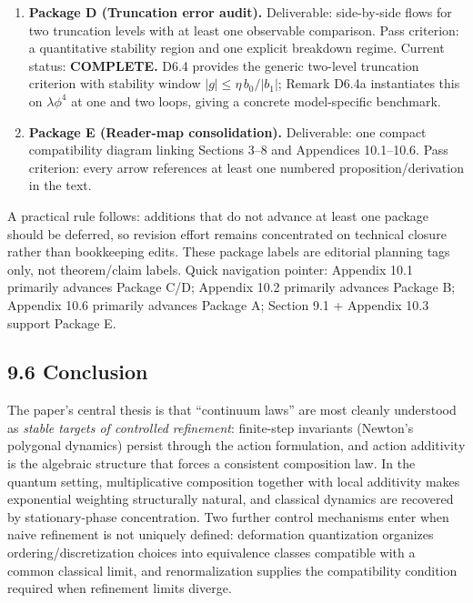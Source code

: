 \documentclass[
]{article}
\begin{document}
\begin{enumerate}
\item
  \textbf{Package D (Truncation error audit).} Deliverable: side-by-side
  flows for two truncation levels with at least one observable
  comparison. Pass criterion: a quantitative stability region and one
  explicit breakdown regime. Current status: \textbf{COMPLETE.} D6.4
  provides the generic two-level truncation criterion with stability
  window \(|g|\le\eta\,b_0/|b_1|\); Remark D6.4a instantiates this on
  \(\lambda\phi^4\) at one and two loops, giving a concrete
  model-specific benchmark.
\item
  \textbf{Package E (Reader-map consolidation).} Deliverable: one
  compact compatibility diagram linking Sections 3--8 and Appendices
  10.1--10.6. Pass criterion: every arrow references at least one
  numbered proposition/derivation in the text.
\end{enumerate}

A practical rule follows: additions that do not advance at least one
package should be deferred, so revision effort remains concentrated on
technical closure rather than bookkeeping edits. These package labels
are editorial planning tags only, not theorem/claim labels. Quick
navigation pointer: Appendix 10.1 primarily advances Package C/D;
Appendix 10.2 primarily advances Package B; Appendix 10.6 primarily
advances Package A; Section 9.1 + Appendix 10.3 support Package E.

\hypertarget{conclusion}{%
\subsection{9.6 Conclusion}\label{conclusion}}

The paper's central thesis is that ``continuum laws'' are most cleanly
understood as \emph{stable targets of controlled refinement}:
finite-step invariants (Newton's polygonal dynamics) persist through the
action formulation, and action additivity is the algebraic structure
that forces a consistent composition law. In the quantum setting,
multiplicative composition together with local additivity makes
exponential weighting structurally natural, and classical dynamics are
recovered by stationary-phase concentration. Two further control
mechanisms enter when naive refinement is not uniquely defined:
deformation quantization organizes ordering/discretization choices into
equivalence classes compatible with a common classical limit, and
renormalization supplies the compatibility condition required when
refinement limits diverge.
\end{document}
